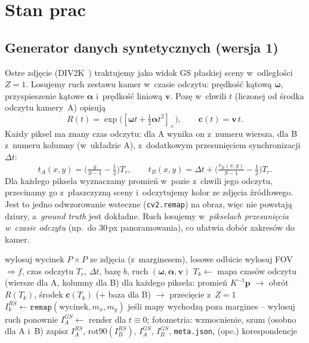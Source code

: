 \documentclass[11pt,a4paper]{article}
\begin{document}
\section{Stan prac}

\subsection{Generator danych syntetycznych (wersja 1)}
Ostre zdjęcie (DIV2K~\cite{div2k}) traktujemy jako widok GS płaskiej sceny w~odległości $Z=1$.
Losujemy ruch zestawu kamer w~czasie odczytu: prędkość kątową $\boldsymbol\omega$,
przyspieszenie kątowe $\boldsymbol\alpha$ i~prędkość liniową $\mathbf v$. Pozę w~chwili $t$
(liczonej od środka odczytu kamery~A) opisują
\begin{equation}
  R(t)=\exp\!\big([\boldsymbol\omega t+\tfrac12\boldsymbol\alpha t^2]_\times\big),\qquad
  \mathbf c(t)=\mathbf v\,t .
\end{equation}
Każdy piksel ma znany czas odczytu: dla A wynika on z~numeru wiersza, dla B z~numeru kolumny
(w~układzie A), z~dodatkowym przesunięciem synchronizacji $\Delta t$:
\begin{equation}
  t_A(x,y)=\Big(\tfrac{y}{S-1}-\tfrac12\Big)T_r,\qquad
  t_B(x,y)=\Delta t+\Big(\tfrac{r_B(x,y)}{S-1}-\tfrac12\Big)T_r .
\end{equation}
Dla każdego piksela wyznaczamy promień w~pozie z~chwili jego odczytu, przecinamy go
z~płaszczyzną sceny i~odczytujemy kolor ze zdjęcia źródłowego. Jest to jedno odwzorowanie
wsteczne (\texttt{cv2.remap}) na obraz, więc nie powstają dziury, a~\emph{ground truth}
jest dokładne. Ruch losujemy w~\emph{pikselach przesunięcia w~czasie odczytu}
(np.\ do 30\,px panoramowania), co ułatwia dobór zakresów do kamer.

\begin{algorithm}[h]
\caption{Generowanie jednej próbki (skrót)}
\small
\begin{algorithmic}[1]
\State wylosuj wycinek $P\times P$ ze zdjęcia (z~marginesem), losowe odbicie
\State wylosuj FOV $\Rightarrow f$, czas odczytu $T_r$, $\Delta t$, bazę $b$, ruch $(\boldsymbol\omega,\boldsymbol\alpha,\mathbf v)$
  \State $T_k \gets$ mapa czasów odczytu (wiersze dla A, kolumny dla B)
  \State dla każdego piksela: promień $K^{-1}\mathbf p$ $\to$ obrót $R(T_k)$, środek $\mathbf c(T_k)$ (+ baza dla B) $\to$ przecięcie z~$Z=1$
  \State $I^{RS}_k \gets \texttt{remap}(\text{wycinek}, m_x, m_y)$ 
\EndFor
\State jeśli mapy wychodzą poza margines -- wylosuj ruch ponownie
\State $I^{GS}_A \gets$ render dla $t\equiv 0$; \;fotometria: wzmocnienie, szum (osobno dla A i~B)
\State zapisz $I^{RS}_A$, $\mathrm{rot90}(I^{RS}_B)$, $I^{GS}_A$, $I^{GS}_B$, \texttt{meta.json}, (opc.) korespondencje
\end{algorithmic}
\end{algorithm}
\end{document}
